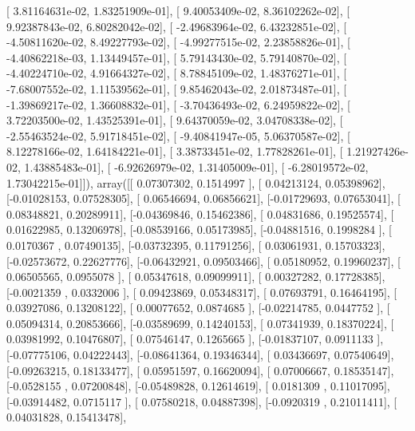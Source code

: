 \documentclass{article}
\begin{document}
       [  3.81164631e-02,   1.83251909e-01],
       [  9.40053409e-02,   8.36102262e-02],
       [  9.92387843e-02,   6.80282042e-02],
       [ -2.49683964e-02,   6.43232851e-02],
       [ -4.50811620e-02,   8.49227793e-02],
       [ -4.99277515e-02,   2.23858826e-01],
       [ -4.40862218e-03,   1.13449457e-01],
       [  5.79143430e-02,   5.79140870e-02],
       [ -4.40224710e-02,   4.91664327e-02],
       [  8.78845109e-02,   1.48376271e-01],
       [ -7.68007552e-02,   1.11539562e-01],
       [  9.85462043e-02,   2.01873487e-01],
       [ -1.39869217e-02,   1.36608832e-01],
       [ -3.70436493e-02,   6.24959822e-02],
       [  3.72203500e-02,   1.43525391e-01],
       [  9.64370059e-02,   3.04708338e-02],
       [ -2.55463524e-02,   5.91718451e-02],
       [ -9.40841947e-05,   5.06370587e-02],
       [  8.12278166e-02,   1.64184221e-01],
       [  3.38733451e-02,   1.77828261e-01],
       [  1.21927426e-02,   1.43885483e-01],
       [ -6.92626979e-02,   1.31405009e-01],
       [ -6.28019572e-02,   1.73042215e-01]]), array([[ 0.07307302,  0.1514997 ],
       [ 0.04213124,  0.05398962],
       [-0.01028153,  0.07528305],
       [ 0.06546694,  0.06856621],
       [-0.01729693,  0.07653041],
       [ 0.08348821,  0.20289911],
       [-0.04369846,  0.15462386],
       [ 0.04831686,  0.19525574],
       [ 0.01622985,  0.13206978],
       [-0.08539166,  0.05173985],
       [-0.04881516,  0.1998284 ],
       [ 0.0170367 ,  0.07490135],
       [-0.03732395,  0.11791256],
       [ 0.03061931,  0.15703323],
       [-0.02573672,  0.22627776],
       [-0.06432921,  0.09503466],
       [ 0.05180952,  0.19960237],
       [ 0.06505565,  0.0955078 ],
       [ 0.05347618,  0.09099911],
       [ 0.00327282,  0.17728385],
       [-0.0021359 ,  0.0332006 ],
       [ 0.09423869,  0.05348317],
       [ 0.07693791,  0.16464195],
       [ 0.03927086,  0.13208122],
       [ 0.00077652,  0.0874685 ],
       [-0.02214785,  0.0447752 ],
       [ 0.05094314,  0.20853666],
       [-0.03589699,  0.14240153],
       [ 0.07341939,  0.18370224],
       [ 0.03981992,  0.10476807],
       [ 0.07546147,  0.1265665 ],
       [-0.01837107,  0.0911133 ],
       [-0.07775106,  0.04222443],
       [-0.08641364,  0.19346344],
       [ 0.03436697,  0.07540649],
       [-0.09263215,  0.18133477],
       [ 0.05951597,  0.16620094],
       [ 0.07006667,  0.18535147],
       [-0.0528155 ,  0.07200848],
       [-0.05489828,  0.12614619],
       [ 0.0181309 ,  0.11017095],
       [-0.03914482,  0.0715117 ],
       [ 0.07580218,  0.04887398],
       [-0.0920319 ,  0.21011411],
       [ 0.04031828,  0.15413478],
\end{document}
